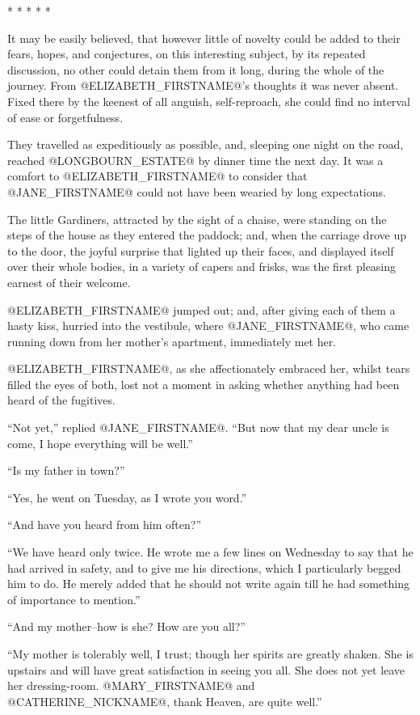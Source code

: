                           * * * * *

It may be easily believed, that however little of novelty could be added
to their fears, hopes, and conjectures, on this interesting subject, by
its repeated discussion, no other could detain them from it long, during
the whole of the journey. From @ELIZABETH_FIRSTNAME@'s thoughts it was never absent.
Fixed there by the keenest of all anguish, self-reproach, she could find
no interval of ease or forgetfulness.

They travelled as expeditiously as possible, and, sleeping one night
on the road, reached @LONGBOURN_ESTATE@ by dinner time the next day. It was a
comfort to @ELIZABETH_FIRSTNAME@ to consider that @JANE_FIRSTNAME@ could not have been wearied
by long expectations.

The little Gardiners, attracted by the sight of a chaise, were standing
on the steps of the house as they entered the paddock; and, when the
carriage drove up to the door, the joyful surprise that lighted up their
faces, and displayed itself over their whole bodies, in a variety of
capers and frisks, was the first pleasing earnest of their welcome.

@ELIZABETH_FIRSTNAME@ jumped out; and, after giving each of them a hasty kiss,
hurried into the vestibule, where @JANE_FIRSTNAME@, who came running down from her
mother's apartment, immediately met her.

@ELIZABETH_FIRSTNAME@, as she affectionately embraced her, whilst tears filled the
eyes of both, lost not a moment in asking whether anything had been
heard of the fugitives.

``Not yet,'' replied @JANE_FIRSTNAME@. ``But now that my dear uncle is come, I hope
everything will be well.''

``Is my father in town?''

``Yes, he went on Tuesday, as I wrote you word.''

``And have you heard from him often?''

``We have heard only twice. He wrote me a few lines on Wednesday to say
that he had arrived in safety, and to give me his directions, which I
particularly begged him to do. He merely added that he should not write
again till he had something of importance to mention.''

``And my mother--how is she? How are you all?''

``My mother is tolerably well, I trust; though her spirits are greatly
shaken. She is upstairs and will have great satisfaction in seeing you
all. She does not yet leave her dressing-room. @MARY_FIRSTNAME@ and @CATHERINE_NICKNAME@, thank
Heaven, are quite well.''

